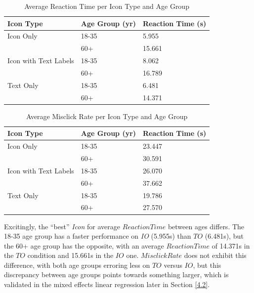 \documentclass[12pt,twoside]{reedthesis}
\begin{document}
    \begin{table}[H]
        \centering
        \begin{tabular}{| p{5cm} | p{3.5cm} | p{3.5cm}|}
            \hline
            Icon Type & Age Group (yr) & Reaction Time (s)\\
            \hline
            Icon Only & 18-35 & 5.955\\
            \hline
            & 60+ & 15.661\\
            \hline
            Icon with Text Labels & 18-35 & 8.062\\
            \hline
            & 60+ & 16.789\\
            \hline
            Text Only & 18-35 & 6.481\\
            \hline
             & 60+ & 14.371\\
            \hline
        \end{tabular}
        \caption{Average Reaction Time per Icon Type and Age Group}
        \label{speed_per_icon_age}
    \end{table}

    \begin{table}[H]
        \centering
        \begin{tabular}{| p{5cm} | p{3.5cm} | p{3.5cm}|}
            \hline
            Icon Type & Age Group (yr) & Reaction Time (s)\\
            \hline
            Icon Only & 18-35 & 23.447\\
            \hline
            & 60+ & 30.591\\
            \hline
            Icon with Text Labels & 18-35 & 26.070\\
            \hline
            & 60+ & 37.662\\
            \hline
            Text Only & 18-35 & 19.786\\
            \hline
             & 60+ & 27.570\\
            \hline
        \end{tabular}
        \caption{Average Misclick Rate per Icon Type and Age Group}
        \label{mr_per_icon_age}
    \end{table}

    Excitingly, the \enquote{best} \textit{Icon} for average $ReactionTime$ between ages differs. The 18-35 age group has a faster performance on \textit{IO} (5.955s) than $TO$ (6.481s), but the 60+ age group has the opposite, with an average $ReactionTime$ of 14.371s in the $TO$ condition and 15.661s in the $IO$ one. $MisclickRate$ does not exhibit this difference, with both age groups erroring less on $TO$ versus $IO$, but this discrepancy between age groups points towards something larger, which is validated in the mixed effects linear regression later in Section \ref{4.2}. 
\end{document}
